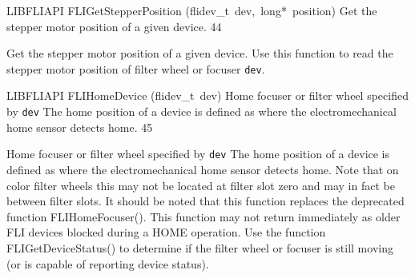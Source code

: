 \documentclass{article}
\begin{document}
\begin{cxxfunction}
{LIBFLIAPI}
        {FLIGetStepperPosition}
        {(flidev\_t\ dev,\ long*\ position)}
        {
 Get the stepper motor position of a given device.}
        {44}
\begin{cxxdoc}

Get the stepper motor position of a given device.  Use this
function to read the stepper motor position of filter wheel or
focuser \texttt{dev}.


\end{cxxdoc}
\end{cxxfunction}
\begin{cxxfunction}
{LIBFLIAPI}
        {FLIHomeDevice}
        {(flidev\_t\ dev)}
        {
 Home focuser or filter wheel specified by \texttt{dev}
 The home position of a device is defined as where the electromechanical
 home sensor detects home.}
        {45}
\begin{cxxdoc}

Home focuser or filter wheel specified by \texttt{dev}
The home position of a device is defined as where the electromechanical
home sensor detects home. Note that on color filter wheels this may not
be located at filter slot zero and may in fact be between filter slots.
It should be noted that this function replaces the deprecated function
FLIHomeFocuser(). This function may not return immediately as older FLI devices
blocked during a HOME operation. Use the function FLIGetDeviceStatus() to
determine if the filter wheel or focuser is still moving (or is capable of reporting
device status).


\end{cxxdoc}
\end{cxxfunction}
\end{document}
